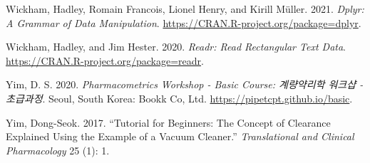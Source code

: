 \documentclass[
  11pt,
  krantz2, a4paper, twoside]{krantz}
\newlength{\cslhangindent}
\newlength{\cslentryspacingunit} %
\newenvironment{CSLReferences}[2] %
 {%
  \setlength{\parindent}{0pt}
  \ifodd #1
  \let\oldpar\par
  \def\par{\hangindent=\cslhangindent\oldpar}
  \fi
  \setlength{\parskip}{#2\cslentryspacingunit}
 }%
 {}
\theoremstyle{definition}
\theoremstyle{definition}
\theoremstyle{definition}
\theoremstyle{definition}
\theoremstyle{remark}
\begin{document}
\begin{CSLReferences}{1}{0}
\leavevmode{}%
Wickham, Hadley, Romain Francois, Lionel Henry, and Kirill Müller. 2021. \emph{Dplyr: A Grammar of Data Manipulation}. \url{https://CRAN.R-project.org/package=dplyr}.

\leavevmode{}%
Wickham, Hadley, and Jim Hester. 2020. \emph{Readr: Read Rectangular Text Data}. \url{https://CRAN.R-project.org/package=readr}.

\leavevmode{}%
Yim, D. S. 2020. \emph{Pharmacometrics Workshop - Basic Course: 계량약리학 워크샵 - 초급과정}. Seoul, South Korea: Bookk Co, Ltd. \url{https://pipetcpt.github.io/basic}.

\leavevmode{}%
Yim, Dong-Seok. 2017. {``Tutorial for Beginners: The Concept of Clearance Explained Using the Example of a Vacuum Cleaner.''} \emph{Translational and Clinical Pharmacology} 25 (1): 1.

\end{CSLReferences}

\printindex
\end{document}
